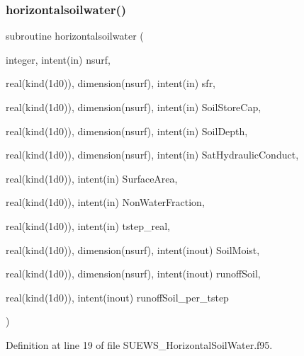 \subsubsection{\texorpdfstring{horizontalsoilwater()}{horizontalsoilwater()}}
{\footnotesize\ttfamily subroutine horizontalsoilwater (\begin{DoxyParamCaption}\item[{integer, intent(in)}]{nsurf,  }\item[{real(kind(1d0)), dimension(nsurf), intent(in)}]{sfr,  }\item[{real(kind(1d0)), dimension(nsurf), intent(in)}]{Soil\+Store\+Cap,  }\item[{real(kind(1d0)), dimension(nsurf), intent(in)}]{Soil\+Depth,  }\item[{real(kind(1d0)), dimension(nsurf), intent(in)}]{Sat\+Hydraulic\+Conduct,  }\item[{real(kind(1d0)), intent(in)}]{Surface\+Area,  }\item[{real(kind(1d0)), intent(in)}]{Non\+Water\+Fraction,  }\item[{real(kind(1d0)), intent(in)}]{tstep\+\_\+real,  }\item[{real(kind(1d0)), dimension(nsurf), intent(inout)}]{Soil\+Moist,  }\item[{real(kind(1d0)), dimension(nsurf), intent(inout)}]{runoff\+Soil,  }\item[{real(kind(1d0)), intent(inout)}]{runoff\+Soil\+\_\+per\+\_\+tstep }\end{DoxyParamCaption})}



Definition at line 19 of file S\+U\+E\+W\+S\+\_\+\+Horizontal\+Soil\+Water.\+f95.

